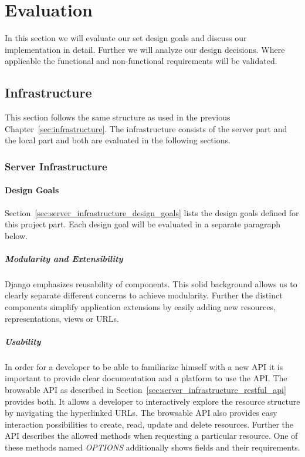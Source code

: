 \chapter{Evaluation}
\label{sec:evaluation}

In this section we will evaluate our set design goals and discuss our implementation in detail.
Further we will analyze our design decisions.
Where applicable the functional and non-functional requirements will be validated.

\section{Infrastructure}

This section follows the same structure as used in the previous Chapter~\ref{sec:infrastructure}.
The infrastructure consists of the server part and the local part and both are evaluated in the following sections.

\subsection{Server Infrastructure}

\subsubsection{Design Goals}

Section~\ref{sec:server_infrastructure_design_goals} lists the design goals defined for this project part.
Each design goal will be evaluated in a separate paragraph below.

\paragraph{Modularity and Extensibility} Django emphasizes reusability of components.
This solid background allows us to clearly separate different concerns to achieve modularity.
Further the distinct components simplify application extensions by easily adding new resources, representations, views or URLs.


\paragraph{Usability} In order for a developer to be able to familiarize himself with a new API it is important to provide clear documentation and a platform to use the API.
The browsable API as described in Section~\ref{sec:server_infrastructure_restful_api} provides both.
It allows a developer to interactively explore the resource structure by navigating the hyperlinked URLs.
The browsable API also provides easy interaction possibilities to create, read, update and delete resources.
Further the API describes the allowed methods when requesting a particular resource.
One of these methods named \emph{OPTIONS} additionally shows fields and their requirements.

